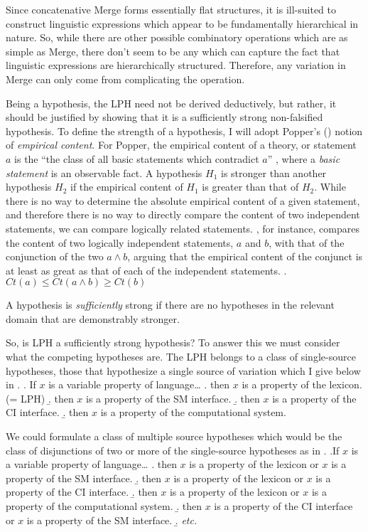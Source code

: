 \documentclass[MilwayThesis]{subfiles}
\begin{document}
Since concatenative Merge forms essentially flat structures, it is ill-suited to construct linguistic expressions which appear to be fundamentally hierarchical in nature.
So, while there are other possible combinatory operations which are as simple as Merge, there don't seem to be any which can capture the fact that linguistic expressions are hierarchically structured.
Therefore, any variation in Merge can only come from complicating the operation.

Being a hypothesis, the LPH need not be derived deductively, but rather, it should be justified by showing that it is a sufficiently strong non-falsified hypothesis.
To define the strength of a hypothesis, I will adopt Popper's (\citeyear{popper1959logic,popper2014conjectures}) notion of \textit{empirical content}.
For Popper, the empirical content of a theory, or statement $a$ is the ``the class of all basic statements which contradict $a$'' \parencite[315]{popper2014conjectures}, where a \textit{basic statement} is an observable fact.
A hypothesis $H_1$ is stronger than another hypothesis $H_2$ if the empirical content of $H_1$ is greater than that of $H_2$.
While there is no way to determine the absolute empirical content of a given statement, and therefore there is no way to directly compare the content of two independent statements, we can compare logically related statements.
\textcite[295]{popper2014conjectures}, for instance, compares the content of two logically independent statements, $a$ and $b$, with that of the conjunction of the two $a\wedge b$, arguing that the empirical content of the conjunct is at least as great as that of each of the independent statements.
\ex. $Ct(a) \leq Ct(a\wedge b) \geq Ct(b)$

A hypothesis is \textit{sufficiently} strong if there are no hypotheses in the relevant domain that are demonstrably stronger.

So, is LPH a sufficiently strong hypothesis?
To answer this we must consider what the competing hypotheses are.
The LPH belongs to a class of single-source hypotheses, those that hypothesize a single source of variation which I give below in \Next.
\ex. If $x$ is a variable property of language\ldots
\a. then $x$ is a property of the lexicon. (= LPH)
\b. then $x$ is a property of the SM interface.
\b. then $x$ is a property of the CI interface.
\b. then $x$ is a property of the computational system.

We could formulate a class of multiple source hypotheses which would be the class of disjunctions of two or more of the single-source hypotheses as in \Next.
\ex.If $x$ is a variable property of language\ldots
\a. then $x$ is a property of the lexicon or $x$ is a property of the SM interface.
\b. then $x$ is a property of the lexicon or $x$ is a property of the CI interface. 
\b. then $x$ is a property of the lexicon or $x$ is a property of the computational system. 
\b. then $x$ is a property of the CI interface or $x$ is a property of the SM interface.
\b. \textit{etc.} 
\end{document}
